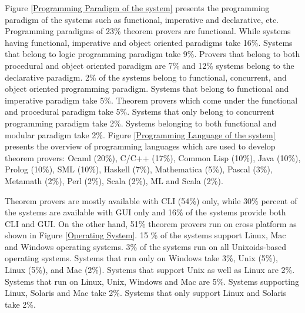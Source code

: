 Figure \ref{Programming Paradigm of the system} presents the programming paradigm of the systems such as functional, imperative and declarative, etc.
Programming paradigms of 23\% theorem provers are functional. While systems having functional, imperative and object oriented paradigms take 
16\%. Systems that belong to logic programming paradigm take 9\%. Provers that belong to both procedural and object oriented paradigm are 
7\% and 12\% systems belong to the declarative paradigm. 2\% of the systems belong to functional, concurrent, 
and object oriented programming paradigm. Systems that belong to functional and imperative paradigm take 5\%. 
Theorem provers which come under the functional and procedural 
paradigm take 5\%. Systems that only belong to concurrent programming paradigm take 2\%. Systems belonging to both functional and modular 
paradigm take 2\%.
Figure \ref{Programming Language of the system} presents the overview of programming languages which are used to develop theorem provers:  
Ocaml (20\%), C/C++ (17\%), Common Lisp (10\%), Java (10\%), Prolog (10\%), SML (10\%), Haskell (7\%), Mathematica (5\%), Pascal (3\%),
Metamath (2\%), Perl (2\%), Scala (2\%), ML and Scala (2\%).

Theorem provers are mostly available with CLI (54\%)  only, while 30\% percent of the
systems are available with GUI only and 16\%  of the systems provide both CLI and GUI.
On the other hand, 51\% theorem provers run on cross platform as shown in Figure \ref{Operating System}. 15 \% of the systems
support Linux, Mac and Windows operating systems. 3\% of the systems run on all Unixoids-based operating systems. Systems that run only
on Windows take 3\%, Unix (5\%), Linux (5\%), and Mac (2\%). Systems that support Unix as well as Linux are 2\%. Systems that 
run on Linux, Unix, Windows and Mac are 5\%. Systems supporting Linux, Solaris and Mac take 2\%. Systems that only support Linux and Solaris
take 2\%.


